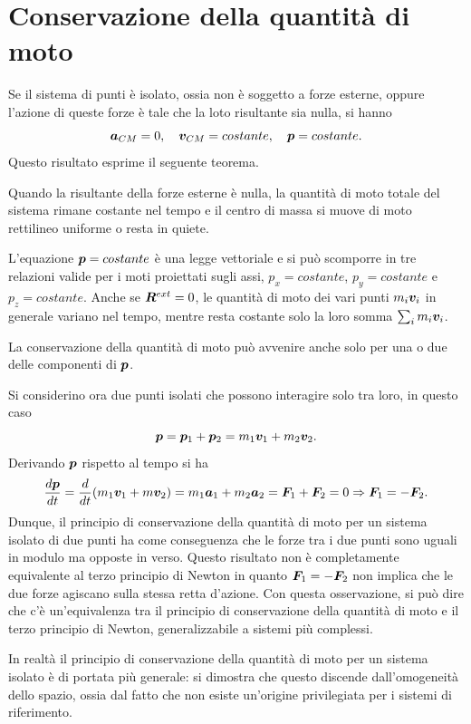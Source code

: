\section{Conservazione della quantità di moto}
Se il sistema di punti è isolato, ossia non è soggetto a forze esterne, oppure l'azione di queste forze è tale che la loto risultante sia nulla, si hanno
\begin{equation}
\label{eq: conervazione della quantità di moto}
    \bm{a}_{CM}=0,\quad\bm{v}_{CM}=costante,\quad\bm{p}=costante.
\end{equation}
Questo risultato esprime il seguente teorema.
\begin{teo}
    Quando la risultante della forze esterne è nulla, la quantità di moto totale del sistema rimane costante nel tempo e il centro di massa si muove di moto rettilineo uniforme o resta in quiete. 
\end{teo}
L'equazione $\bm{p}=costante$ è una legge vettoriale e si può scomporre in tre relazioni valide per i moti proiettati sugli assi, $p_x=costante$, $p_y=costante$ e $p_z=costante$. Anche se $\bm{R}^{ext}=0$, le quantità di moto dei vari punti $m_i\bm{v}_i$ in generale variano nel tempo, mentre resta costante solo la loro somma $\sum_im_i\bm{v}_i$.
\begin{obs}
    La conservazione della quantità di moto può avvenire anche solo per una o due delle componenti di $\bm{p}$. 
\end{obs}
Si considerino ora due punti isolati che possono interagire solo tra loro, in questo caso
\begin{equation}
    \bm{p}=\bm{p}_1+\bm{p}_2=m_1\bm{v}_1+m_2\bm{v}_2.
\end{equation}
Derivando $\bm{p}$ rispetto al tempo si ha
\begin{equation}
    \frac{d\bm{p}}{dt}=\frac{d}{dt}(m_1\bm{v}_1+m\bm{v}_2)=m_1\bm{a}_1+m_2\bm{a}_2=\bm{F}_1+\bm{F}_2=0\Rightarrow \bm{F}_1=-\bm{F}_2.
\end{equation}
Dunque, il principio di conservazione della quantità di moto per un sistema isolato di due punti ha come conseguenza che le forze tra i due punti sono uguali in modulo ma opposte in verso. Questo risultato non è completamente equivalente al terzo principio di Newton in quanto $\bm{F}_1=-\bm{F}_2$ non implica che le due forze agiscano sulla stessa retta d'azione. Con questa osservazione, si può dire che c'è un'equivalenza tra il principio di conservazione della quantità di moto e il terzo principio di Newton, generalizzabile a sistemi più complessi. 
\begin{obs}
    In realtà il principio di conservazione della quantità di moto per un sistema isolato è di portata più generale: si dimostra che questo discende dall'omogeneità dello spazio, ossia dal fatto che non esiste un'origine privilegiata per i sistemi di riferimento. 
\end{obs}
